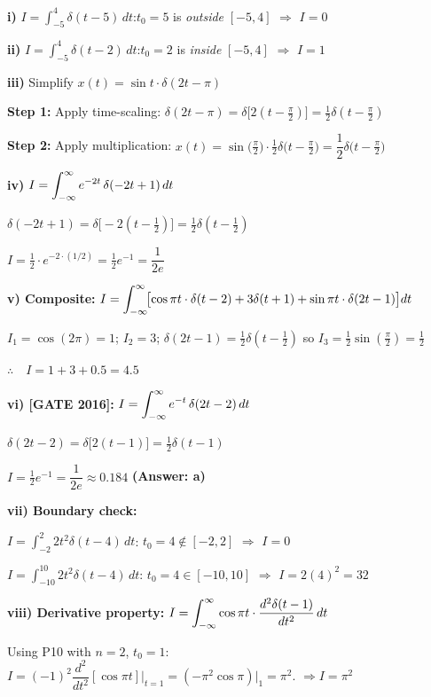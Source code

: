 \documentclass[10pt,a4paper]{article}
\newcommand{\Int}{\displaystyle\int_{-\infty}^{\infty}}
\begin{document}
\begin{exbox}
\textbf{i)} $I=\displaystyle\int_{-5}^{4}\delta(t-5)\,dt$:\quad $t_0=5$ is \emph{outside} $[-5,4]$ $\Rightarrow$ $\boxed{I=0}$

\medskip
\textbf{ii)} $I=\displaystyle\int_{-5}^{4}\delta(t-2)\,dt$:\quad $t_0=2$ is \emph{inside} $[-5,4]$ $\Rightarrow$ $\boxed{I=1}$

\medskip
\textbf{iii)} Simplify $x(t)=\sin t\cdot\delta(2t-\pi)$

\textbf{Step 1:} Apply time-scaling: $\delta(2t-\pi)=\delta\bigl[2(t-\tfrac{\pi}{2})\bigr]=\tfrac{1}{2}\delta(t-\tfrac{\pi}{2})$

\textbf{Step 2:} Apply multiplication: $x(t)=\sin\!\bigl(\tfrac{\pi}{2}\bigr)\cdot\tfrac{1}{2}\delta\!\bigl(t-\tfrac{\pi}{2}\bigr)=\boxed{\dfrac{1}{2}\delta\!\bigl(t-\tfrac{\pi}{2}\bigr)}$

\medskip
\textbf{iv)} $I=\displaystyle\Int e^{-2t}\,\delta(-2t+1)\,dt$

$\delta(-2t+1)=\delta\bigl[-2(t-\tfrac{1}{2})\bigr]=\tfrac{1}{2}\delta(t-\tfrac{1}{2})$

$I=\tfrac{1}{2}\cdot e^{-2\cdot(1/2)}=\tfrac{1}{2}e^{-1}=\boxed{\dfrac{1}{2e}}$

\medskip
\textbf{v) Composite:} $I=\displaystyle\Int\!\bigl[\cos\pi t\cdot\delta(t-2)+3\delta(t+1)+\sin\pi t\cdot\delta(2t-1)\bigr]dt$

$I_1 = \cos(2\pi)=1$; \quad $I_2 = 3$; \quad $\delta(2t-1)=\tfrac{1}{2}\delta(t-\tfrac{1}{2})$ so $I_3=\tfrac{1}{2}\sin(\tfrac{\pi}{2})=\tfrac{1}{2}$

$\therefore\quad I = 1+3+0.5 = \boxed{4.5}$

\medskip
\textbf{vi) [GATE 2016]:} $I=\displaystyle\Int e^{-t}\,\delta(2t-2)\,dt$

$\delta(2t-2)=\delta\bigl[2(t-1)\bigr]=\tfrac{1}{2}\delta(t-1)$

$I=\tfrac{1}{2}e^{-1}=\boxed{\dfrac{1}{2e}}\approx 0.184$ \quad\textbf{(Answer: a)}

\medskip
\textbf{vii) Boundary check:}

$I=\displaystyle\int_{-2}^{2}2t^2\delta(t-4)\,dt$: $t_0=4\notin[-2,2]$ $\Rightarrow$ $I=\boxed{0}$

$I=\displaystyle\int_{-10}^{10}2t^2\delta(t-4)\,dt$: $t_0=4\in[-10,10]$ $\Rightarrow$ $I=2(4)^2=\boxed{32}$

\medskip
\textbf{viii) Derivative property:} $I=\displaystyle\Int\cos\pi t\cdot\frac{d^2\delta(t-1)}{dt^2}\,dt$

Using P10 with $n=2$, $t_0=1$: $I=(-1)^2\dfrac{d^2}{dt^2}[\cos\pi t]\Big|_{t=1} = (-\pi^2\cos\pi)\big|_1 = \pi^2$. \quad $\Rightarrow I=\boxed{\pi^2}$
\end{exbox}
\end{document}
